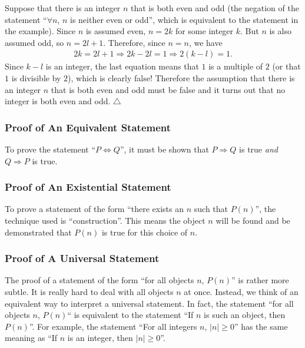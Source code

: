 \begin{sol*}
Suppose that there is an integer $n$ that is both even and odd (the negation of the statement ``$\forall n$, $n$ is neither even or odd'', which is equivalent to the statement in the example). Since $n$ is assumed even, $n = 2k$ for some integer $k$. But $n$ is also assumed odd, so $n= 2l + 1$. Therefore, since $n = n$, we have 
	\begin{align*}
	2k = 2l + 1 \Rightarrow 2k - 2l = 1 \Rightarrow 2 (k - l) = 1 .
	\end{align*}
Since $k - l$ is an integer, the last equation means that $1$ is a multiple of $2$ (or that $1$ is divisible by $2$), which is clearly false! Therefore the assumption that there is an integer $n$ that is both even and odd must be false and it turns out that no integer is both even and odd. \hfill $\triangle$
\end{sol*} 

\subsubsection*{Proof of An Equivalent Statement}

To prove the statement ``$P \iff Q$'', it must be shown that $P \Rightarrow Q$ is true \textit{and} $Q \Rightarrow P$ is true.

\subsubsection*{Proof of An Existential Statement}

To prove a statement of the form ``there exists an $n$ such that $P (n)$'', the technique used is ``construction''. This means the object $n$ will be found and be demonstrated that $P (n)$ is true for this choice of $n$.

\subsubsection*{Proof of A Universal Statement}

The proof of a statement of the form ``for all objects $n$, $P (n)$'' is rather more subtle. It is really hard to deal with all objects $n$ at once. Instead, we think of an equivalent way to interpret a universal statement. In fact, the statement ``for all objects $n$, $P (n)$`` is equivalent to the statement ``If $n$ is such an object, then $P (n)$''. For example, the statement ``For all integers $n$, $|n| \geq 0$'' has the same meaning as ``If $n$ is an integer, then $|n| \geq 0$''.

